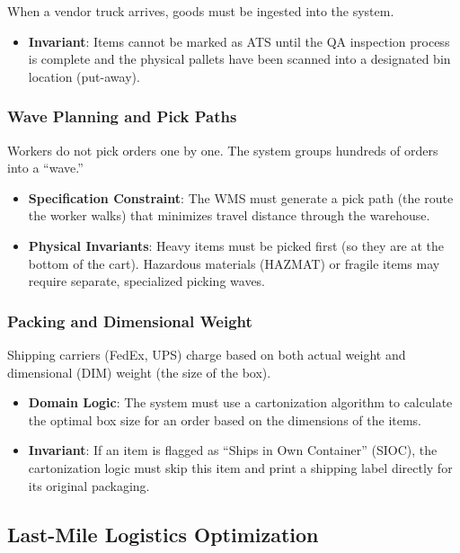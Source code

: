 When a vendor truck arrives, goods must be ingested into the system.

\begin{itemize}
\tightlist
\item
  \textbf{Invariant}: Items cannot be marked as ATS until the QA
  inspection process is complete and the physical pallets have been
  scanned into a designated bin location (put-away).
\end{itemize}

\subsubsection{Wave Planning and Pick
Paths}\label{wave-planning-and-pick-paths}

Workers do not pick orders one by one. The system groups hundreds of
orders into a ``wave.''

\begin{itemize}
\tightlist
\item
  \textbf{Specification Constraint}: The WMS must generate a pick path
  (the route the worker walks) that minimizes travel distance through
  the warehouse.
\item
  \textbf{Physical Invariants}: Heavy items must be picked first (so
  they are at the bottom of the cart). Hazardous materials (HAZMAT) or
  fragile items may require separate, specialized picking waves.
\end{itemize}

\subsubsection{Packing and Dimensional
Weight}\label{packing-and-dimensional-weight}

Shipping carriers (FedEx, UPS) charge based on both actual weight and
dimensional (DIM) weight (the size of the box).

\begin{itemize}
\tightlist
\item
  \textbf{Domain Logic}: The system must use a cartonization algorithm
  to calculate the optimal box size for an order based on the dimensions
  of the items.
\item
  \textbf{Invariant}: If an item is flagged as ``Ships in Own
  Container'' (SIOC), the cartonization logic must skip this item and
  print a shipping label directly for its original packaging.
\end{itemize}

\subsection{Last-Mile Logistics
Optimization}\label{last-mile-logistics-optimization}

